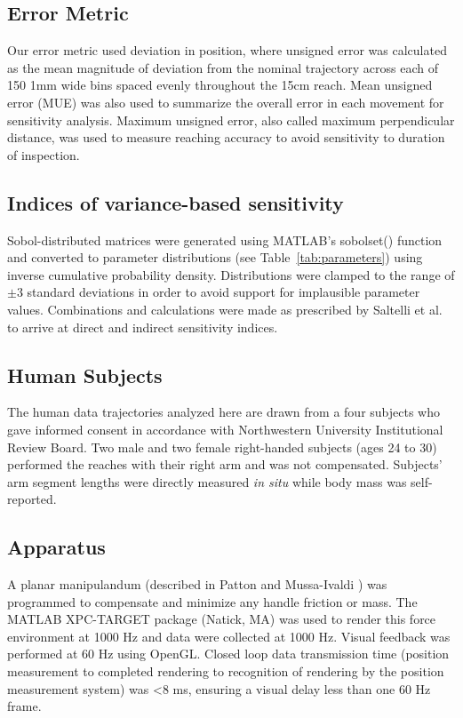 \documentclass[10pt]{article}
\begin{document}
\subsection*{Error Metric}
Our error metric used deviation in position, where unsigned error was calculated as the mean magnitude of deviation from the nominal trajectory across each of 150 1mm wide bins spaced evenly throughout the 15cm reach.  Mean unsigned error (MUE) was also used to summarize the overall error in each movement for sensitivity analysis. Maximum unsigned error, also called maximum perpendicular distance, was used to measure reaching accuracy to avoid sensitivity to duration of inspection.

\subsection*{Indices of variance-based sensitivity}
Sobol-distributed matrices were generated using MATLAB's sobolset() function and converted to parameter distributions (see Table~\ref{tab:parameters}) using inverse cumulative probability density. Distributions were clamped to the range of $\pm3$ standard deviations in order to avoid support for implausible parameter values. Combinations and calculations were made as prescribed by Saltelli et al. \cite{saltelli2010variance} to arrive at direct and indirect sensitivity indices.

\subsection*{Human Subjects}
The human data trajectories analyzed here are drawn from a four subjects who gave informed consent in accordance with Northwestern University Institutional Review Board. Two male and two female right-handed subjects (ages 24 to 30) performed the reaches with their right arm and was not compensated. Subjects' arm segment lengths were directly measured \textit{in situ} while body mass was self-reported.

\subsection*{Apparatus}
A planar manipulandum (described in Patton and Mussa-Ivaldi \cite{patton2004robot}) was programmed to compensate and minimize any handle friction or mass. The MATLAB XPC-TARGET package (Natick, MA) was used to render this force environment at 1000 Hz and data were collected at 1000 Hz.  Visual feedback was performed at 60 Hz using OpenGL. Closed loop data transmission time (position measurement to completed rendering to recognition of rendering by the position measurement system) was <8 ms, ensuring a visual delay less than one 60 Hz frame.
\end{document}
